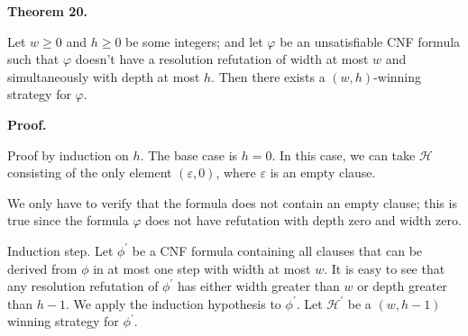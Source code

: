 \par\medskip\noindent\textbf{
Theorem 20.
}\par



Let $w\geq 0$ and $h\geq 0$ be some integers;
and let $\varphi$ be an unsatisfiable CNF formula such that $\varphi$ doesn’t have a resolution refutation of width
at most $w$ and simultaneously with depth at most $h$.
Then there exists a $(w,h)$-winning strategy for $\varphi$.\par



\par\medskip\noindent\textbf{Proof.}\par


Proof by induction on $h$. The base case is $h=0$. In this case, we can take $\mathcal{H}$ consisting of the only
element $(\varepsilon,0)$, where $\varepsilon$ is an empty clause.\par



We only have to verify that the formula does not contain an empty clause; this is true since the formula $\varphi$
does not have refutation with depth zero and width zero.\par



Induction step. Let $\phi^{\prime}$ be a CNF formula containing all clauses that can be derived from $\phi$ in at most one step with width at most $w$.
It is easy to see that any resolution refutation of $\phi^{\prime}$ has either width greater than $w$ or depth greater than $h-1$.
We apply the induction hypothesis to $\phi^{\prime}$. Let $\mathcal{H^{\prime}}$ be a $(w,h-1)$ winning strategy for $\phi^{\prime}$.\par


